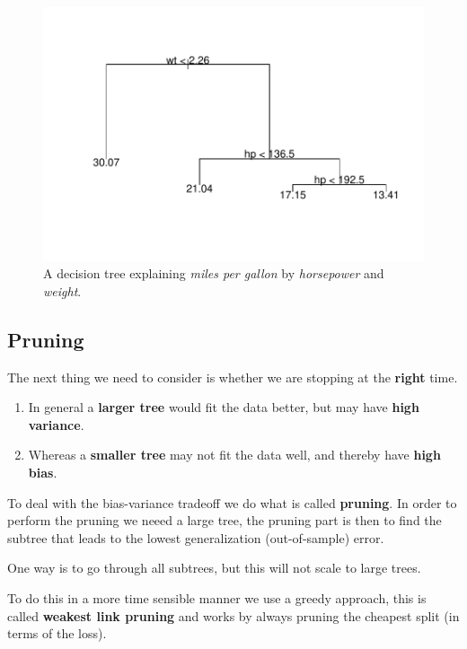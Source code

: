\documentclass[aspectratio=169,10pt]{beamer}
\begin{document}
\begin{frame}{\secname}{\subsecname}
  \begin{figure}
    \includegraphics[width=.6\textwidth]{scripts/output/multi-tree.pdf}
    \caption{A decision tree explaining \textit{miles per gallon} by \textit{horsepower} and \textit{weight}.}
  \end{figure}
\end{frame}

\subsection{Pruning}
\begin{frame}{\secname}{\subsecname}
  The next thing we need to consider is whether we are stopping at the \textbf{right} time.
  \begin{enumerate}
    \item In general a \textbf{larger tree} would fit the data better, but may have \textbf{high variance}.
    \item Whereas a \textbf{smaller tree} may not fit the data well, and thereby have \textbf{high bias}.
  \end{enumerate}
  To deal with the bias-variance tradeoff we do what is called \textbf{pruning}.
  In order to perform the pruning we neeed a large tree, the pruning part is then to find the subtree that leads to the lowest generalization (out-of-sample) error.

  One way is to go through all subtrees, but this will not scale to large trees.

  To do this in a more time sensible manner we use a greedy approach, this is called \textbf{weakest link pruning} and works by always pruning the cheapest split (in terms of the loss).
\end{frame}
\end{document}
